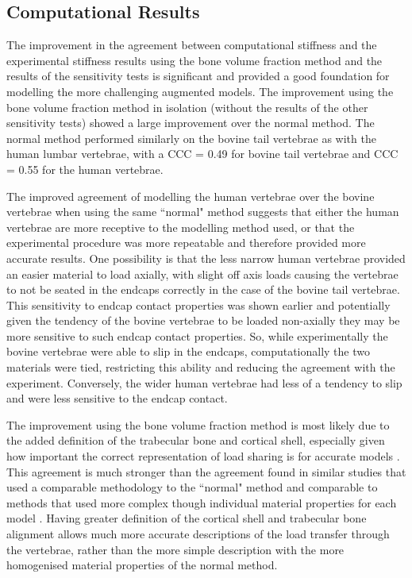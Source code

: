 \subsection{Computational Results}

The improvement in the agreement between computational stiffness and the
experimental stiffness results using the bone volume fraction method and the
results of the sensitivity tests is significant and provided a good foundation
for modelling the more challenging augmented models.  The improvement using the
bone volume fraction method in isolation (without the results of the other
sensitivity tests) showed a large improvement over the normal method.  The
normal method performed similarly on the bovine tail vertebrae as with the
human lumbar vertebrae, with a CCC = 0.49 for bovine tail vertebrae and CCC =
0.55 for the human vertebrae. 

The improved agreement of modelling the human vertebrae over the bovine
vertebrae when using the same ``normal" method suggests that either the human
vertebrae are more receptive to the modelling method used, or that the
experimental procedure was more repeatable and therefore provided more accurate
results. One possibility is that the less narrow human vertebrae provided an
easier material to load axially, with slight off axis loads causing the
vertebrae to not be seated in the endcaps correctly in the case of the bovine
tail vertebrae. This sensitivity to endcap contact properties was shown earlier
and potentially given the tendency of the bovine vertebrae to be loaded
non-axially they may be more sensitive to such endcap contact properties. So,
while experimentally the bovine vertebrae were able to slip in the endcaps,
computationally the two materials were tied, restricting this ability and
reducing the agreement with the experiment. Conversely, the wider human
vertebrae had less of a tendency to slip and were less sensitive to the endcap
contact.

The improvement using the bone volume fraction method is most likely due to the
added definition of the trabecular bone and cortical shell, especially given
how important the correct representation of load sharing is for accurate models
\cite{eswaran2006cortical}. This agreement is much stronger than the agreement
found in similar studies that used a comparable methodology to the ``normal"
method \cite{Wijayathunga2008, zapata2017methodology, RobsonBrown2014} and
comparable to methods that used more complex though individual material
properties for each model \cite{Kinzl2012,kinzl2013experimentally}.  Having
greater definition of the cortical shell and trabecular bone alignment allows
much more accurate descriptions of the load transfer through the vertebrae,
rather than the more simple description with the more homogenised material
properties of the normal method.

